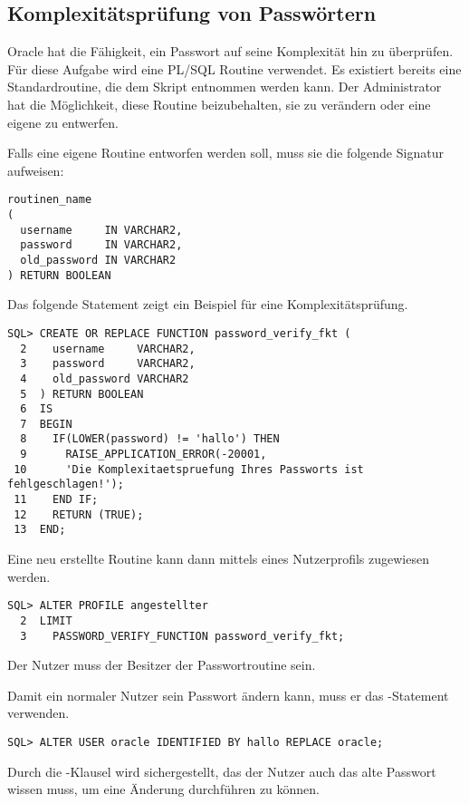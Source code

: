       \subsection{Komplexitätsprüfung von Passwörtern}
        Oracle hat die Fähigkeit, ein Passwort auf seine Komplexität hin zu überprüfen. Für diese Aufgabe wird eine PL/SQL Routine verwendet. Es existiert bereits eine Standardroutine, die dem Skript  entnommen werden kann. Der Administrator hat die Möglichkeit, diese Routine beizubehalten, sie zu verändern oder eine eigene zu entwerfen.

        Falls eine eigene Routine entworfen werden soll, muss sie die folgende Signatur aufweisen:
        \begin{lstlisting}[caption={Format der Passwortroutine},label=admin224,language=plsql]
routinen_name
(
  username     IN VARCHAR2,
  password     IN VARCHAR2,
  old_password IN VARCHAR2
) RETURN BOOLEAN
        \end{lstlisting}
        Das folgende Statement zeigt ein Beispiel für eine Komplexitätsprüfung.
        \begin{lstlisting}[caption={Beispielkomplexitätsroutine},label=admin225, language=plsql]
SQL> CREATE OR REPLACE FUNCTION password_verify_fkt (
  2    username     VARCHAR2,
  3    password     VARCHAR2,
  4    old_password VARCHAR2
  5  ) RETURN BOOLEAN
  6  IS
  7  BEGIN
  8    IF(LOWER(password) != 'hallo') THEN
  9      RAISE_APPLICATION_ERROR(-20001,
 10      'Die Komplexitaetspruefung Ihres Passworts ist fehlgeschlagen!');
 11    END IF;
 12    RETURN (TRUE);
 13  END;
        \end{lstlisting}
        Eine neu erstellte Routine kann dann mittels eines Nutzerprofils zugewiesen werden.
        \begin{lstlisting}[caption={Passwortroutine
        zuweisen},label=admin226,language=oracle_sql]
SQL> ALTER PROFILE angestellter
  2  LIMIT
  3    PASSWORD_VERIFY_FUNCTION password_verify_fkt;
        \end{lstlisting}
        \begin{merke}
          Der Nutzer  muss der Besitzer der Passwortroutine sein.
        \end{merke}
        Damit ein normaler Nutzer sein Passwort ändern kann, muss er das
        -Statement verwenden.
        \begin{lstlisting}[caption={Ein Nutzer ändert sein Passwort}, label=admin227, language=oracle_sql]
SQL> ALTER USER oracle IDENTIFIED BY hallo REPLACE oracle;
        \end{lstlisting}
        Durch die -Klausel wird sichergestellt, das der Nutzer auch das alte Passwort wissen muss, um eine Änderung durchführen zu können.
